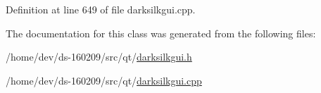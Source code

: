 Definition at line 649 of file darksilkgui.\+cpp.



The documentation for this class was generated from the following files\+:\begin{DoxyCompactItemize}
\item 
/home/dev/ds-\/160209/src/qt/\hyperlink{darksilkgui_8h}{darksilkgui.\+h}\item 
/home/dev/ds-\/160209/src/qt/\hyperlink{darksilkgui_8cpp}{darksilkgui.\+cpp}\end{DoxyCompactItemize}

